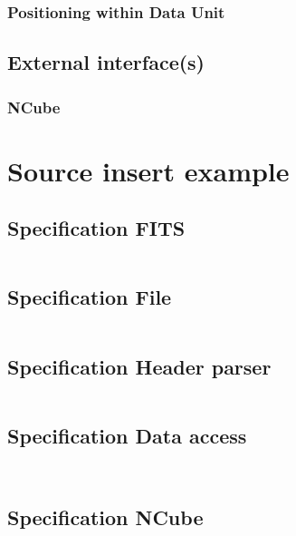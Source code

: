 \documentclass[a4paper,10pt]{article}
\begin{document}
\subsubsection{Positioning within Data Unit}




\subsection{External interface(s)}
\subsubsection{NCube}







\section{Source insert example}

\subsection{Specification FITS}
\inputminted{ada}{../lib/src/fits.ads}

\subsection{Specification File}
\inputminted{ada}{../lib/src/file.ads}

\subsection{Specification Header parser}
\inputminted{ada}{../lib/src/parser/strict.ads}

\subsection{Specification Data access}
\inputminted{ada}{../lib/src/data/generic_data_value.ads}
\inputminted{ada}{../lib/src/data/generic_data_unit.ads}

\subsection{Specification NCube}
\inputminted{ada}{../lib/src/ncube/ncube_funcs.ads}
\inputminted{ada}{../lib/src/ncube/ncube.ads}






\end{document}
